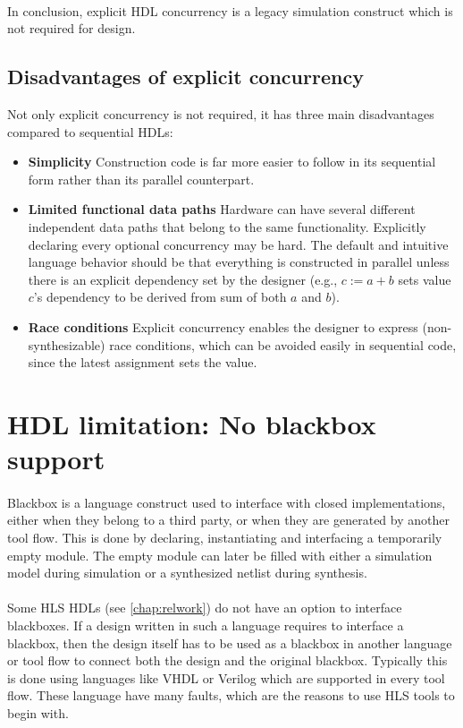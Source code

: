 \paragraph{}In conclusion, explicit HDL concurrency is a legacy simulation construct which is not required for design. 

\subsection*{Disadvantages of explicit concurrency}
Not only explicit concurrency is not required, it has three main disadvantages compared to sequential HDLs:
\begin{itemize}
\item \textbf{Simplicity} \quad Construction code is far more easier to follow in its sequential form rather than its parallel counterpart.
\item \textbf{Limited functional data paths} \quad Hardware can have several different independent data paths that belong to the same functionality. Explicitly declaring every optional concurrency may be hard. The default and intuitive language behavior should be that everything is constructed in parallel unless there is an explicit dependency set by the designer (e.g., $c:=a+b$ sets value $c$'s dependency to be derived from sum of both $a$ and $b$).
\item \textbf{Race conditions} \quad Explicit concurrency enables the designer to express (non-synthesizable) race conditions, which can be avoided easily in sequential code, since the latest assignment sets the value.
\end{itemize}


\section{HDL limitation: No blackbox support}
\paragraph{}Blackbox is a language construct used to interface with closed implementations, either when they belong to a third party, or when they are generated by another tool flow. This is done by declaring, instantiating and interfacing a temporarily empty module. The empty module can later be filled with either a simulation model during simulation or a synthesized netlist during synthesis.
\paragraph{}Some HLS HDLs (see \autoref{chap:relwork}) do not have an option to interface blackboxes. If a design written in such a language requires to interface a blackbox, then the design itself has to be used as a blackbox in another language or tool flow to connect both the design and the original blackbox. Typically this is done using languages like VHDL or Verilog which are supported in every tool flow. These language have many faults, which are the reasons to use HLS tools to begin with.
